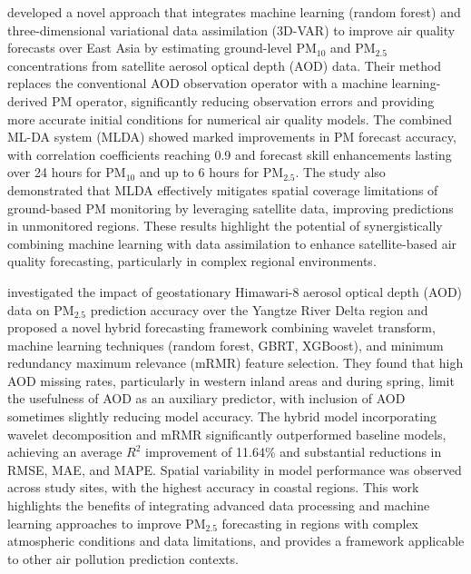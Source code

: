 \documentclass[11pt]{article}
\begin{document}
\citet{lee2021air} developed a novel approach that integrates machine learning (random forest) and three-dimensional variational data assimilation (3D-VAR) to improve air quality forecasts over East Asia by estimating ground-level PM$_{10}$ and PM$_{2.5}$ concentrations from satellite aerosol optical depth (AOD) data. Their method replaces the conventional AOD observation operator with a machine learning-derived PM operator, significantly reducing observation errors and providing more accurate initial conditions for numerical air quality models. The combined ML-DA system (MLDA) showed marked improvements in PM forecast accuracy, with correlation coefficients reaching 0.9 and forecast skill enhancements lasting over 24 hours for PM$_{10}$ and up to 6 hours for PM$_{2.5}$. The study also demonstrated that MLDA effectively mitigates spatial coverage limitations of ground-based PM monitoring by leveraging satellite data, improving predictions in unmonitored regions. These results highlight the potential of synergistically combining machine learning with data assimilation to enhance satellite-based air quality forecasting, particularly in complex regional environments.

\citet{karimian2023evaluation} investigated the impact of geostationary Himawari-8 aerosol optical depth (AOD) data on PM$_{2.5}$ prediction accuracy over the Yangtze River Delta region and proposed a novel hybrid forecasting framework combining wavelet transform, machine learning techniques (random forest, GBRT, XGBoost), and minimum redundancy maximum relevance (mRMR) feature selection. They found that high AOD missing rates, particularly in western inland areas and during spring, limit the usefulness of AOD as an auxiliary predictor, with inclusion of AOD sometimes slightly reducing model accuracy. The hybrid model incorporating wavelet decomposition and mRMR significantly outperformed baseline models, achieving an average \( R^{2} \) improvement of 11.64\% and substantial reductions in RMSE, MAE, and MAPE. Spatial variability in model performance was observed across study sites, with the highest accuracy in coastal regions. This work highlights the benefits of integrating advanced data processing and machine learning approaches to improve PM$_{2.5}$ forecasting in regions with complex atmospheric conditions and data limitations, and provides a framework applicable to other air pollution prediction contexts.
\end{document}

